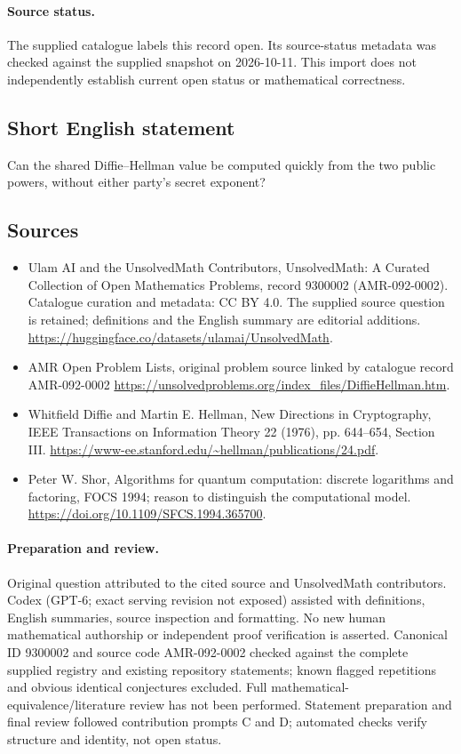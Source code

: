 \documentclass[11pt]{article}
\begin{document}
\paragraph{Source status.}
The supplied catalogue labels this record open. Its source-status metadata was checked against the supplied snapshot on 2026-10-11. This import does not independently establish current open status or mathematical correctness.
\subsection{Short English statement}
Can the shared Diffie--Hellman value be computed quickly from the two public powers, without either party's secret exponent?
\subsection{Sources}
\begin{itemize}
\item[\hypertarget{source:9300002:1}{S1}] Ulam AI and the UnsolvedMath Contributors, UnsolvedMath: A Curated Collection of Open Mathematics Problems, record 9300002 (AMR-092-0002). Catalogue curation and metadata: CC BY 4.0. The supplied source question is retained; definitions and the English summary are editorial additions.
\url{https://huggingface.co/datasets/ulamai/UnsolvedMath}.
\item[\hypertarget{source:9300002:2}{S2}] AMR Open Problem Lists, original problem source linked by catalogue record AMR-092-0002
\url{https://unsolvedproblems.org/index_files/DiffieHellman.htm}.
\item[\hypertarget{source:9300002:3}{S3}] Whitfield Diffie and Martin E. Hellman, New Directions in Cryptography, IEEE Transactions on Information Theory 22 (1976), pp. 644--654, Section III.
\url{https://www-ee.stanford.edu/~hellman/publications/24.pdf}.
\item[\hypertarget{source:9300002:4}{S4}] Peter W. Shor, Algorithms for quantum computation: discrete logarithms and factoring, FOCS 1994; reason to distinguish the computational model.
\url{https://doi.org/10.1109/SFCS.1994.365700}.
\end{itemize}
\paragraph{Preparation and review.}
Original question attributed to the cited source and UnsolvedMath contributors. Codex (GPT-6; exact serving revision not exposed) assisted with definitions, English summaries, source inspection and formatting. No new human mathematical authorship or independent proof verification is asserted. Canonical ID 9300002 and source code AMR-092-0002 checked against the complete supplied registry and existing repository statements; known flagged repetitions and obvious identical conjectures excluded. Full mathematical-equivalence/literature review has not been performed. Statement preparation and final review followed contribution prompts C and D; automated checks verify structure and identity, not open status.
\label{end:9300002}
\end{document}
